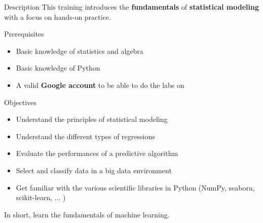 \begin{frame}{Description}
  This training introduces the \textbf{fundamentals} of \textbf{statistical modeling} with a focus on hands-on practice.
\end{frame}

\begin{frame}{Prerequisites}
  \begin{itemize}
  \item Basic knowledge of statistics and algebra
  \item Basic knowledge of Python
  \item A valid \textbf{Google account} to be able to do the labs on 
  \end{itemize}
\end{frame}

\begin{frame}{Objectives}
  \begin{itemize}
  \item Understand the principles of statistical modeling
  \item Understand the different types of regressions
  \item Evaluate the performances of a predictive algorithm
  \item Select and classify data in a big data environment
  \item Get familiar with the various scientific libraries in Python (NumPy, seaborn, scikit-learn, ... )
  \end{itemize}
  In short, learn the fundamentals of machine learning.
\end{frame}

